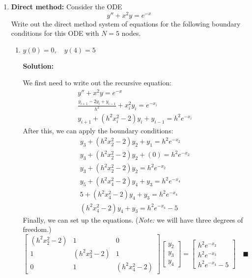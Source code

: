\documentclass[letterpaper, fontsize=11pt]{scrartcl} %
\numberwithin{equation}{section} %
\numberwithin{figure}{section} %
\numberwithin{table}{section} %
\begin{document}
\begin{enumerate}
%

\item \textbf{Direct method:} Consider the ODE
\[ y'' + x^2y = e^{-x}\]
Write out the direct method system of equations for the following boundary conditions for this ODE with $N=5$ nodes.
\begin{enumerate}

\item $y(0) = 0, \quad y(4) = 5$
\par \textbf{Solution:} 
\par We first need to write out the recursive equation:
\begin{gather*}
y'' + x^2y = e^{-x}\\
\frac{y_{i+1} - 2y_i + y_{i-1}}{h^2} + x_i^2y_i = e^{-x_i}\\
y_{i+1}+ (h^2x_i^2- 2)y_i + y_{i-1}= h^2e^{-x_i}
\end{gather*}
After this, we can apply the boundary conditions: 
\begin{gather*}
y_{3}+ (h^2x_2^2- 2)y_2 + y_{1}= h^2e^{-x_2} \\
y_{3}+ (h^2x_2^2- 2)y_2 + (0)= h^2e^{-x_2} \\
y_{3}+ (h^2x_2^2- 2)y_2= h^2e^{-x_2} \\
y_{5}+ (h^2x_4^2- 2)y_4 + y_{3}= h^2e^{-x_4} \\
5+ (h^2x_4^2- 2)y_4 + y_{3}= h^2e^{-x_4} \\
(h^2x_4^2- 2)y_4 + y_{3}= h^2e^{-x_4} - 5
\end{gather*}
Finally, we can set up the equations. (\textit{Note:} we will have three degrees of freedom.)
\[
\left[\begin{array}{ccc} 
(h^2x_2^2- 2) & 1 & 0\\
1 &  (h^2x_3^2- 2) & 1 \\
0 & 1 &  (h^2x_4^2- 2)\end{array} \right]
\left[ \begin{array}{c} y_2 \\ y_3 \\ y_4\end{array} \right] 
= \left[ \begin{array}{c} h^2e^{-x_2} \\ h^2e^{-x_3} \\ h^2e^{-x_4} - 5\end{array} \right] \quad\blacksquare
\]


\end{enumerate}
\end{enumerate}
\end{document}
